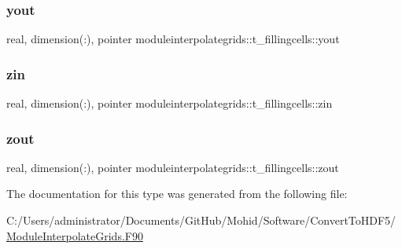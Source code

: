 \subsubsection{\texorpdfstring{yout}{yout}}
{\footnotesize\ttfamily real, dimension(\+:), pointer moduleinterpolategrids\+::t\+\_\+fillingcells\+::yout\hspace{0.3cm}{\ttfamily [private]}}

\mbox{\label{structmoduleinterpolategrids_1_1t__fillingcells_afd6aa60fed33fd0281226d08063d38e6}} 
\subsubsection{\texorpdfstring{zin}{zin}}
{\footnotesize\ttfamily real, dimension(\+:), pointer moduleinterpolategrids\+::t\+\_\+fillingcells\+::zin\hspace{0.3cm}{\ttfamily [private]}}

\mbox{\label{structmoduleinterpolategrids_1_1t__fillingcells_af8b2ef10bf80526bdc32e7572c4cc9fc}} 
\subsubsection{\texorpdfstring{zout}{zout}}
{\footnotesize\ttfamily real, dimension(\+:), pointer moduleinterpolategrids\+::t\+\_\+fillingcells\+::zout\hspace{0.3cm}{\ttfamily [private]}}



The documentation for this type was generated from the following file\+:\begin{DoxyCompactItemize}
\item 
C\+:/\+Users/administrator/\+Documents/\+Git\+Hub/\+Mohid/\+Software/\+Convert\+To\+H\+D\+F5/\mbox{\hyperlink{_module_interpolate_grids_8_f90}{Module\+Interpolate\+Grids.\+F90}}\end{DoxyCompactItemize}
